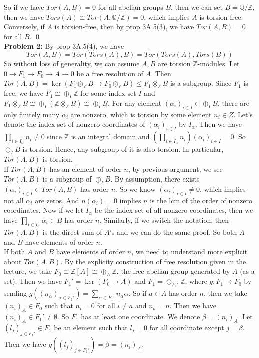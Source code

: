 \documentclass[12pt]{amsart}
\newcommand{\Q}{\mathbb{Q}}
\newcommand{\Z}{\mathbb{Z}}
\begin{document}
So if we have $Tor(A,B)=0$ for all abelian groups $B$, then we can set $B=\Q/\Z$, then we have $Tors(A)\cong Tor(A,\Q/\Z)=0$, which implies $A$ is torsion-free.\\
Conversely, if $A$ is torsion-free, then by prop 3A.5(3), we have $Tor(A,B)=0$ for all $B$.
\qed\\
\textbf{Problem 2:} By prop 3A.5(4), we have 
\[Tor(A,B)=Tor(Tors(A),B)=Tor(Tors(A),Tors(B))\]
So without loss of generality, we can assume $A,B$ are torsion $\Z$-modules. Let $0\to F_1\to F_0\to A\to 0$ be a free resolution of $A$. Then $Tor(A,B)=\ker(F_1\otimes_\Z B\to F_0\otimes_\Z B)\leq F_1\otimes_\Z B$ is a subgroup. Since $F_1$ is free, we have $F_1\cong \oplus_I \Z$ for some index set $I$ and $F_1\otimes_\Z B\cong \oplus_I (\Z\otimes_\Z B)\cong \oplus_I B$. For any element $(\alpha_i)_{i\in I}\in \oplus_I B$, there are only finitely many $\alpha_i$ are nonzero, which is torsion by some element $n_i\in Z$. Let's denote the index set of nonzero coordinates of $(\alpha_i)_{i\in I}$ by $I_\alpha$. Then we have $\prod_{i\in I_\alpha}n_i\neq 0$ since $\Z$ is an integral domain and  $(\prod_{i\in I_\alpha}n_i)(\alpha_i)_{i\in I}=0$. So $\oplus_I B$ is torsion. Hence, any subgroup of it is also torsion. In particular, $Tor(A,B)$ is torsion.\\
If $Tor(A,B)$ has an element of order $n$, by previous argument, we see $Tor(A,B)$ is a subgroup of $\oplus_I B$. By assumption, there exists $(\alpha_i)_{i\in I}\in Tor(A,B)$ has order $n$. So we know $(\alpha_i)_{i\in I}\neq 0$, which implies not all $\alpha_i$ are zeros. And $n(\alpha_i)=0$ implies $n$ is the lcm of the order of nonzero coordinates. Now if we let $I_\alpha$ be the index set of all nonzero coordinates, then we have $\prod_{i\in I_\alpha} \alpha_i\in B$ has order $n$. Similarly, if we switch the notation, then $Tor(A,B)$ is the direct sum of $A$'s and we can do the same proof. So both $A$ and $B$ have elements of order $n$.\\
If both $A$ and $B$ have elements of order $n$, we need to understand more explicit about $Tor(A,B)$. By the explicity construction of free resolution given in the lecture, we take $F_0\cong \Z[A]\cong \oplus_A \Z$, the free abelian group generated by $A$ (as a set). Then we have $F_1'=\ker(F_0\to A)$ and $F_1=\oplus_{F_1'}\Z$, where $g:F_1\to F_0$ by sending $g((n_\alpha)_{\alpha\in F_1'})=\sum_{\alpha\in F_1'}n_\alpha\alpha$.
So if $a\in A$ has order $n$, then we take $(n_i)_A\in F_0$ such that $n_i=0$ for all $i\neq a$ and $n_a=n$. Then we have $(n_i)_A\in F_1'\neq \emptyset$. So $F_1$ has at least one coordinate. We denote $\beta=(n_i)_A$. Let $(l_j)_{j\in F_1'}\in F_1$ be an element such that $l_j=0$ for all coordinate except $j=\beta$. Then we have $g((l_j)_{j\in F_1'})=\beta=(n_i)_A$.\\
\end{document}

